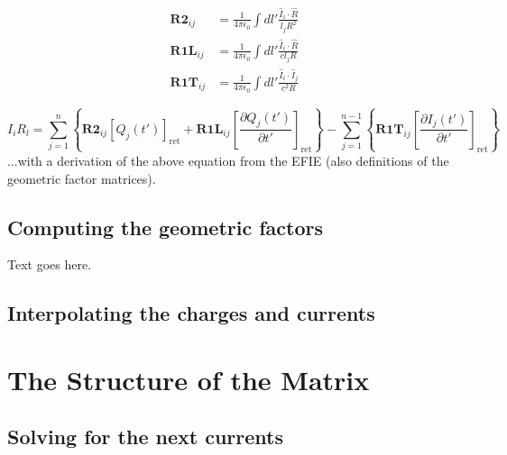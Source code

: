 \documentclass{article}
\newcommand{\mat}{\mathbf}
\begin{document}

\begin{align}
\mat{R2}_{ij} &= \frac{1}{4\pi\epsilon_0}\int dl' \frac{\hat{I}_i\cdot\hat{R}}{l_j R^2}\\
\mat{R1L}_{ij} &= \frac{1}{4\pi\epsilon_0}\int dl' \frac{\hat{I}_i\cdot\hat{R}}{c l_j R}\\
\mat{R1T}_{ij} &= \frac{1}{4\pi\epsilon_0}\int dl' \frac{\hat{I}_i\cdot\hat{I}_j}{c^2 R}
\end{align}

\begin{equation}
I_iR_l =
\sum_{j=1}^n \left\{\mat{R2}_{ij}\left[Q_j(t')\right]_\text{ret}
+ \mat{R1L}_{ij}\left[\frac{\partial Q_j(t')}{\partial t'}\right]_\text{ret}\right\}
- \sum_{j=1}^{n-1}\left\{\mat{R1T}_{ij}\left[\frac{\partial I_j(t')}{\partial t'}\right]_\text{ret}\right\}
\end{equation}
...with a derivation of the above equation from the EFIE (also definitions of the geometric factor matrices).

\subsection{Computing the geometric factors}
Text goes here.

\subsection{Interpolating the charges and currents}

\section{The Structure of the Matrix}
\subsection{Solving for the next currents}
\end{document}

